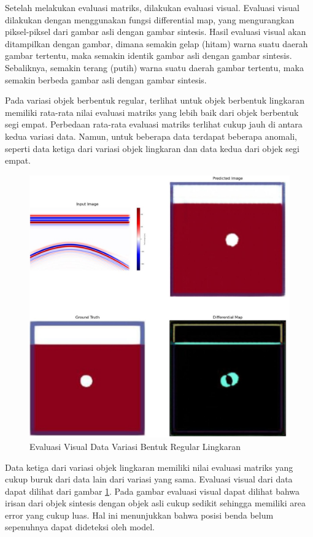 Setelah melakukan evaluasi matriks, dilakukan evaluasi visual. 
Evaluasi visual dilakukan dengan menggunakan fungsi differential map, yang mengurangkan piksel-piksel dari gambar asli dengan gambar sintesis. 
Hasil evaluasi visual akan ditampilkan dengan gambar, dimana semakin gelap (hitam) warna suatu daerah gambar tertentu, maka semakin identik gambar asli dengan gambar sintesis. 
Sebaliknya, semakin terang (putih) warna suatu daerah gambar tertentu, maka semakin berbeda gambar asli dengan gambar sintesis.

Pada variasi objek berbentuk regular, terlihat untuk objek berbentuk lingkaran memiliki rata-rata nilai evaluasi matriks yang lebih baik dari objek berbentuk segi empat. 
Perbedaan rata-rata evaluasi matriks terlihat cukup jauh di antara kedua variasi data. 
Namun, untuk beberapa data terdapat beberapa anomali, seperti data ketiga dari variasi objek lingkaran dan data kedua dari objek segi empat. 

\begin{figure}[ht]
  \centering
  \includegraphics[scale=0.15]{gambar/diffMapLingkaran.jpg}
  \caption{Evaluasi Visual Data Variasi Bentuk Regular Lingkaran}
  \label{fig:diffmaplingkaran}
\end{figure}

Data ketiga dari variasi objek lingkaran memiliki nilai evaluasi matriks yang cukup buruk dari data lain dari variasi yang sama. 
Evaluasi visual dari data dapat dilihat dari gambar \ref{fig:diffmaplingkaran}. 
Pada gambar evaluasi visual dapat dilihat bahwa irisan dari objek sintesis dengan objek asli cukup sedikit sehingga memiliki area error yang cukup luas. 
Hal ini menunjukkan bahwa posisi benda belum sepenuhnya dapat dideteksi oleh model.

